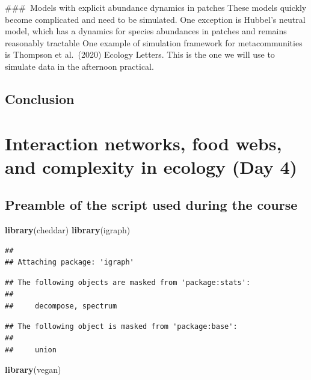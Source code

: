\documentclass[
]{book}
\newenvironment{Shaded}{\begin{snugshade}}{\end{snugshade}}
\newcommand{\FunctionTok}[1]{\textcolor[rgb]{0.13,0.29,0.53}{\textbf{#1}}}
\newcommand{\NormalTok}[1]{#1}
\theoremstyle{definition}
\theoremstyle{definition}
\theoremstyle{definition}
\theoremstyle{definition}
\theoremstyle{remark}
\begin{document}
\#\#\#~Models with explicit abundance dynamics in patches
These models quickly become complicated and need to be simulated.
One exception is Hubbel's neutral model, which has a dynamics for species abundances in patches and remains reasonably tractable
One example of simulation framework for metacommunities is Thompson et al.~(2020) Ecology Letters. This is the one we will use to simulate data in the afternoon practical.

\section{Conclusion}\label{conclusion-1}

\chapter{Interaction networks, food webs, and complexity in ecology (Day 4)}\label{interaction-networks-food-webs-and-complexity-in-ecology-day-4}

\section{Preamble of the script used during the course}\label{preamble-of-the-script-used-during-the-course}

\begin{Shaded}
\begin{Highlighting}[]
\FunctionTok{library}\NormalTok{(cheddar)}
\FunctionTok{library}\NormalTok{(igraph)}
\end{Highlighting}
\end{Shaded}

\begin{verbatim}
## 
## Attaching package: 'igraph'
\end{verbatim}

\begin{verbatim}
## The following objects are masked from 'package:stats':
## 
##     decompose, spectrum
\end{verbatim}

\begin{verbatim}
## The following object is masked from 'package:base':
## 
##     union
\end{verbatim}

\begin{Shaded}
\begin{Highlighting}[]
\FunctionTok{library}\NormalTok{(vegan)}
\end{Highlighting}
\end{Shaded}
\end{document}
